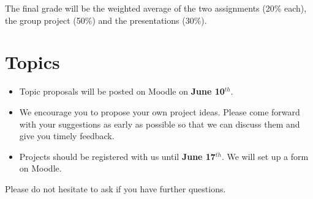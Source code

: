 \documentclass[]{article}
\begin{document}
The final grade will be the weighted average of the two assignments
(20\% each), the group project (50\%) and the presentations (30\%).

\hypertarget{topics}{%
\section{Topics}\label{topics}}

\begin{itemize}
\item
  Topic proposals will be posted on Moodle on \textbf{June 10\(^{th}\)}.
\item
  We encourage you to propose your own project ideas. Please come
  forward with your suggestions as early as possible so that we can
  discuss them and give you timely feedback.
\item
  Projects should be registered with us until \textbf{June 17\(^{th}\)}.
  We will set up a form on Moodle.
\end{itemize}

Please do not hesitate to ask if you have further questions.




\newpage
\singlespacing 
\end{document}
